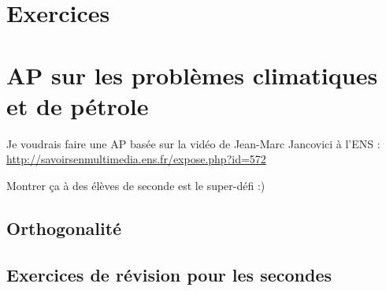 \section{Exercices}


\section{AP sur les problèmes climatiques et de pétrole}

Je voudrais faire une AP basée sur la vidéo de Jean-Marc Jancovici à l'ENS :
\url{http://savoirsenmultimedia.ens.fr/expose.php?id=572}

Montrer ça à des élèves de seconde est le super-défi :)

\subsection{Orthogonalité}


\subsection{Exercices de révision pour les secondes}

